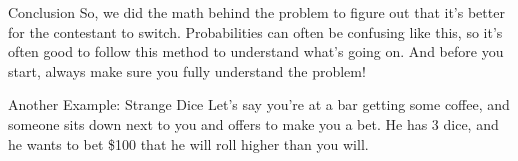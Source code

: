 \documentclass{beamer}
\begin{document}
\begin{frame}{Conclusion}
    So, we did the math behind the problem to figure out that it's better for the contestant to switch. Probabilities can often be confusing like this, so it's often good to follow this method to understand what's going on. And before you start, always make sure you fully understand the problem!
\end{frame}

\begin{frame}{Another Example: Strange Dice}
    Let's say you're at a bar getting some coffee, and someone sits down next to you and offers to make you a bet. He has 3 dice, and he wants to bet \$100 that he will roll higher than you will. \vspace{2mm}
    
\end{frame}
\end{document}
